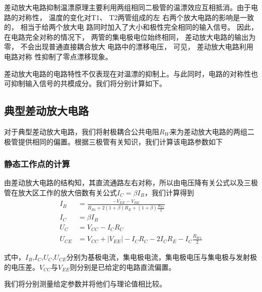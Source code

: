 \documentclass[a4paper,11pt,UTF8]{ctexart}
\begin{document}
	差动放大电路抑制温漂原理主要利用两组相同二极管的温漂效应互相抵消。由于电路的对称性， 温度的变化对T1、 T2两管组成的左
	右两个放大电路的影响是一致的， 相当于给两个放大电
	路同时加入了大小和极性完全相同的输入信号。 因此，
	在电路完全对称的情况下， 两管的集电极电位始终相同，
	差动放大电路的输出为零， 不会出现普通直接耦合放大
	电路中的漂移电压， 可见， 差动放大电路利用电路对称
	性抑制了零点漂移现象。
	
	差动放大电路的电路特性不仅表现在对温漂的抑制上。与此同时，电路的对称性也可抑制输入信号的共模成分。我们将分别计算如下。
	\subsection{典型差动放大电路}
	对于典型差动放大电路，我们将射极耦合公共电阻$R_W$来为差动放大电路的两组二极管提供相同的偏置。根据三极管有关知识，我们计算该电路参数如下
	\subsubsection{静态工作点的计算}
	由差动放大电路的结构知，其直流通路左右对称，所以由电压降有关公式以及三极管在放大区工作的放大倍数有关公式$I_C = \beta I_B$，我们计算得到
	\begin{equation}
		\begin{aligned}
		I_B &=\frac{-V_{EE}-V_{BE}}{R_{B1}+2(1+\beta)R_E+(1+\beta)\frac{R_{W1}}{2}}\\
		I_C &= \beta I_B\\
		U_C&=V_{CC}-I_CR_C\\
		U_{CE}&=V_{CC}+|V_{EE}|-I_CR_C-2I_CR_E-I_C\frac{R_{W1}}{2}
		\end{aligned}
	\end{equation}
	
	式中，$I_B$,$I_C$,$U_C$,$U_{CE}$分别为基极电流，集电极电流，集电极电压与集电极与发射极的电压差。$V_{CC}$与$V_{EE}$则分别是已给定的电路直流偏置。

	我们将分别测量给定参数并将他们与理论值相比较。
	
	
\end{document}
